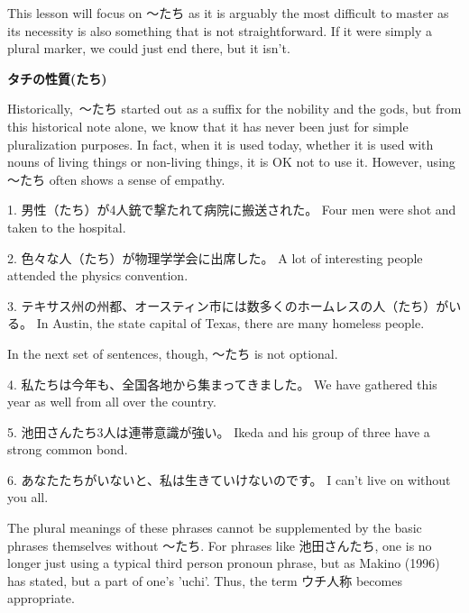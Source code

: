\par{ This lesson will focus on ～たち as it is arguably the most difficult to master as its necessity is also something that is not straightforward. If it were simply a plural marker, we could just end there, but it isn't. }

\begin{center}
 \textbf{タチの性質(たち) }
\end{center}

\par{ Historically, ～たち started out as a suffix for the nobility and the gods, but from this historical note alone, we know that it has never been just for simple pluralization purposes. In fact, when it is used today, whether it is used with nouns of living things or non-living things, it is OK not to use it. However, using ～たち often shows a sense of empathy. }

\par{1. 男性（たち）が4人銃で撃たれて病院に搬送された。 \hfill\break
Four men were shot and taken to the hospital. }

\par{2. 色々な人（たち）が物理学学会に出席した。 \hfill\break
A lot of interesting people attended the physics convention. }

\par{3. テキサス州の州都、オースティン市には数多くのホームレスの人（たち）がいる。 \hfill\break
In Austin, the state capital of Texas, there are many homeless people. }

\par{ In the next set of sentences, though, ～たち is not optional. }

\par{4. 私たちは今年も、全国各地から集まってきました。 \hfill\break
We have gathered this year as well from all over the country. }

\par{5. 池田さんたち3人は連帯意識が強い。 \hfill\break
Ikeda and his group of three have a strong common bond. }

\par{6. あなたたちがいないと、私は生きていけないのです。 \hfill\break
I can't live on without you all. }

\par{ The plural meanings of these phrases cannot be supplemented by the basic phrases themselves without ～たち. For phrases like 池田さんたち, one is no longer just using a typical third person pronoun phrase, but as Makino (1996) has stated, but a part of one's 'uchi'. Thus, the term ウチ人称 becomes appropriate. }

